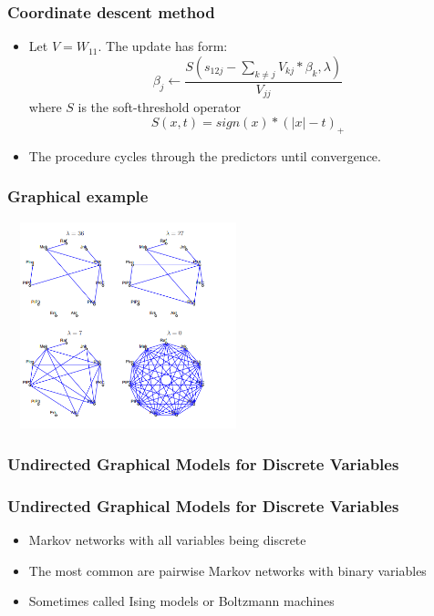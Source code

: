 \documentclass{beamer}
\begin{document}
\begin{frame}
\frametitle{Coordinate descent method}
\begin{itemize}
\item Let $V=W_{11}$. The update has form:
\begin{equation}
\beta_j \leftarrow \frac{S(s_{12j}-\sum_{k \neq j}V_{kj}*\beta_k, \lambda)}{V_{jj}}
\end{equation}
where $S$ is the soft-threshold operator
\begin{equation}
S(x, t)=sign(x) * (|x| - t)_+
\end{equation}
\item The procedure cycles through the predictors until convergence.
\end{itemize}
\end{frame}

\begin{frame}
\frametitle{Graphical example}
\includegraphics[width=7cm, height=6cm]{lasso solutions}
\end{frame}

\begin{frame}
\frametitle{Undirected Graphical Models for Discrete Variables}
\end{frame}

\begin{frame}
\frametitle{Undirected Graphical Models for Discrete Variables}
\begin{itemize}
\item Markov networks with all variables being discrete
\item The most common are pairwise Markov networks with binary variables
\item Sometimes called Ising models or Boltzmann machines
\end{itemize}
\end{frame}
\end{document}
